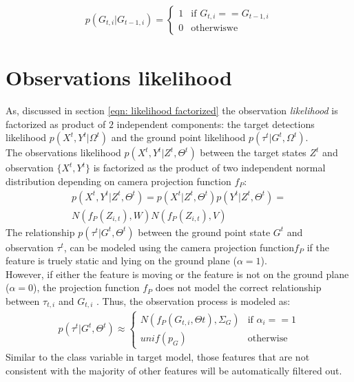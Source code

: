 \begin{eqnarray} \label{eqn: Ground dynamics}
 p(G_{t,i} |G_{t-1,i})= \left\{
\begin{array}{rl}
1 & \mbox{if }  G_{t,i}==G_{t-1,i} \\
0 & \mbox{otherwiswe } 
\end{array}
\right.
\end{eqnarray}

\section{Observations likelihood}
As, discussed in section \ref{eqn: likelihood factorized} the observation \textit{likelihood} is factorized as product of $2$ independent components:
the target detections likelihood $p(X^{t}, Y^t | \Omega^{t})$ and the ground point likelihood $p(\tau^{t} | G^t , \Omega^{t})$.\\
The observations likelihood  $p(X^t, Y^t |Z^t, \Theta^t)$ between the target states $Z^t$ and observation $\{X^t, Y^t \}$ is factorized as the product of two independent normal distribution depending on camera projection function $f_P$:
\begin{eqnarray} \label{eqn: observations likelihood}
p(X^t,Y^t | Z^t , \Theta^t )= p(X^t | Z^t , \Theta^t )p( Y^t | Z^t , \Theta^t ) = \\ \nonumber
N(f_P(Z_{i,t}),W) N(f_P(Z_{i,t}),V)
\end{eqnarray}
The relationship $p(\tau^t |G^t , \Theta^t )$ between the ground point state $G^t$ and observation $\tau^t$,  can be modeled using the camera projection function$ f_P$ if the feature is truely static and lying on the ground plane ($\alpha=1$). \\
However, if either the feature is moving or the feature is not on the ground plane ($\alpha=0$), the projection function $f_P$ does not model the correct relationship between $\tau_{t,i}$ and $G_{t,i}$ . 
Thus, the observation process is modeled as:
\begin{eqnarray} \label{eqn: Ground observation Model}
p(\tau^t | G^t , \Theta^t ) \approx
\left\{
\begin{array}{rl}
 N(f_P (G_{t,i} , Θt ), \Sigma_G ) & \mbox{if }  \alpha_i==1 \\
 unif (p_G )  & \mbox{otherwise }
\end{array}
 \right.
\end{eqnarray}
Similar to the class variable in target model, those features that are not consistent with the majority of other features will be automatically filtered out.

